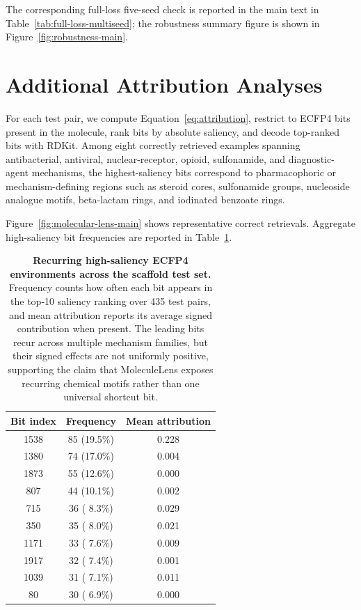 \documentclass{article}
\begin{document}
The corresponding full-loss five-seed check is reported in the main text in Table~\ref{tab:full-loss-multiseed}; the robustness summary figure is shown in Figure~\ref{fig:robustness-main}.

\section{Additional Attribution Analyses}
\label{app:attribution}

For each test pair, we compute Equation~\ref{eq:attribution}, restrict to ECFP4 bits present in the molecule, rank bits by absolute saliency, and decode top-ranked bits with RDKit. Among eight correctly retrieved examples spanning antibacterial, antiviral, nuclear-receptor, opioid, sulfonamide, and diagnostic-agent mechanisms, the highest-saliency bits correspond to pharmacophoric or mechanism-defining regions such as steroid cores, sulfonamide groups, nucleoside analogue motifs, beta-lactam rings, and iodinated benzoate rings.

Figure~\ref{fig:molecular-lens-main} shows representative correct retrievals. Aggregate high-saliency bit frequencies are reported in Table~\ref{tab:universal-bits}.

\begin{table}[!htbp]
\centering
\small
\caption{\textbf{Recurring high-saliency ECFP4 environments across the scaffold test set.} Frequency counts how often each bit appears in the top-10 saliency ranking over 435 test pairs, and mean attribution reports its average signed contribution when present. The leading bits recur across multiple mechanism families, but their signed effects are not uniformly positive, supporting the claim that MoleculeLens exposes recurring chemical motifs rather than one universal shortcut bit.}
\label{tab:universal-bits}
\begin{tabular}{c c c}
\toprule
Bit index & Frequency & Mean attribution \\
\midrule
1538 & 85 (19.5\%) & 0.228 \\
1380 & 74 (17.0\%) & 0.004 \\
1873 & 55 (12.6\%) & 0.000 \\
807  & 44 (10.1\%) & 0.002 \\
715  & 36 ( 8.3\%) & 0.029 \\
350  & 35 ( 8.0\%) & 0.021 \\
1171 & 33 ( 7.6\%) & 0.009 \\
1917 & 32 ( 7.4\%) & 0.001 \\
1039 & 31 ( 7.1\%) & 0.011 \\
80   & 30 ( 6.9\%) & 0.000 \\
\bottomrule
\end{tabular}
\end{table}
\end{document}
